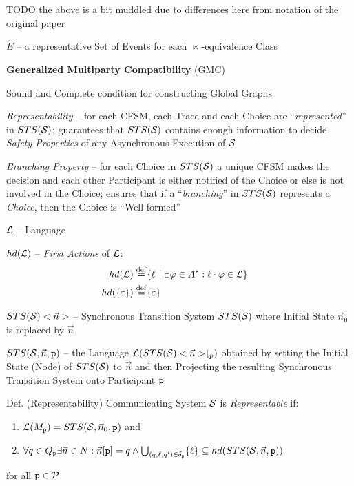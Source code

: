 TODO the above is a bit muddled due to differences here from notation
of the original paper

$\hat{E}$ -- a representative Set of Events for each
$\bowtie$-equivalence Class


\textbf{Generalized Multiparty Compatibility} (GMC)

Sound and Complete condition for constructing Global Graphs

\emph{Representability} -- for each CFSM, each Trace and each Choice
are ``\emph{represented}'' in $STS(\mathcal{S})$; guarantees that
$STS(\mathcal{S})$ contains enough information to decide \emph{Safety
  Properties} of any Asynchronous Execution of $\mathcal{S}$

\emph{Branching Property} -- for each Choice in $STS(\mathcal{S})$ a
unique CFSM makes the decision and each other Participant is either
notified of the Choice or else is not involved in the Choice; ensures
that if a ``\emph{branching}'' in $STS(\mathcal{S})$ represents a
\emph{Choice}, then the Choice is ``Well-formed''


$\mathcal{L}$ -- Language

$hd(\mathcal{L})$ -- \emph{First Actions} of $\mathcal{L}$:
\begin{align*}
  hd(\mathcal{L}) \stackrel{\mathrm{def}}=& \{ \ell \ |\ \exists\varphi \in A^*
    : \ell\cdot\varphi \in \mathcal{L} \} & \\
  hd(\{\varepsilon\}) \stackrel{\mathrm{def}}=& \{ \varepsilon \} &
\end{align*}

$STS(\mathcal{S})<\vec{n}>$ -- Synchronous Transition System
$STS(\mathcal{S})$ where Initial State $\vec{n}_0$ is replaced by
$\vec{n}$

$STS(\mathcal{S},\vec{n},\mathtt{p})$ -- the Language
$\mathcal{L}(STS(\mathcal{S})<\vec{n}>\downharpoonright_p)$ obtained by
setting the Initial State (Node) of $STS(\mathcal{S})$ to $\vec{n}$ and
then Projecting the resulting Synchronous Transition System onto
Participant $\mathtt{p}$


Def. (Representability) Communicating System $\mathcal{S}$ is
\emph{Representable} if:
\begin{enumerate}
  \item $\mathcal{L}(M_\mathtt{p}) = STS(\mathcal{S},\vec{n}_0,\mathtt{p})$ and
  \item $\forall q \in Q_\mathtt{p} \exists \vec{n} \in N :
    \vec{n}[\mathtt{p}] = q \wedge
      \bigcup_{(q,\ell,q')\in\delta_\mathtt{p}} \{ \ell \}
        \subseteq hd(STS(\mathcal{S},\vec{n},\mathtt{p}))$
\end{enumerate}
for all $\mathtt{p} \in \mathcal{P}$


